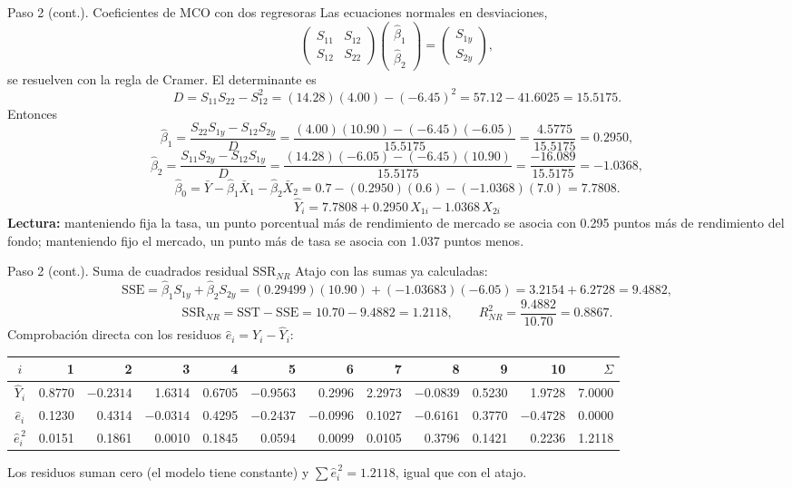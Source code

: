 \documentclass[11pt,letterpaper]{article}
\newcommand{\SSR}{\mathrm{SSR}}
\newcommand{\SSE}{\mathrm{SSE}}
\newcommand{\SST}{\mathrm{SST}}
\begin{document}
\begin{paso}{Paso 2 (cont.). Coeficientes de MCO con dos regresoras}
Las ecuaciones normales en desviaciones,
\[
\begin{pmatrix}S_{11}&S_{12}\\ S_{12}&S_{22}\end{pmatrix}
\begin{pmatrix}\hat\beta_1\\ \hat\beta_2\end{pmatrix}
=\begin{pmatrix}S_{1y}\\ S_{2y}\end{pmatrix},
\]
se resuelven con la regla de Cramer. El determinante es
\[
D=S_{11}S_{22}-S_{12}^2=(14.28)(4.00)-(-6.45)^2=57.12-41.6025=15.5175 .
\]
Entonces
\[
\hat\beta_1=\frac{S_{22}S_{1y}-S_{12}S_{2y}}{D}
=\frac{(4.00)(10.90)-(-6.45)(-6.05)}{15.5175}
=\frac{4.5775}{15.5175}=0.2950,
\]
\[
\hat\beta_2=\frac{S_{11}S_{2y}-S_{12}S_{1y}}{D}
=\frac{(14.28)(-6.05)-(-6.45)(10.90)}{15.5175}
=\frac{-16.089}{15.5175}=-1.0368,
\]
\[
\hat\beta_0=\bar Y-\hat\beta_1\bar X_1-\hat\beta_2\bar X_2
=0.7-(0.2950)(0.6)-(-1.0368)(7.0)=7.7808 .
\]
\[
\boxed{\ \hat Y_i=7.7808+0.2950\,X_{1i}-1.0368\,X_{2i}\ }
\]
\textbf{Lectura:} manteniendo fija la tasa, un punto porcentual más de rendimiento de mercado se asocia
con 0.295 puntos más de rendimiento del fondo; manteniendo fijo el mercado, un punto más de tasa se
asocia con 1.037 puntos menos.
\end{paso}

\begin{paso}{Paso 2 (cont.). Suma de cuadrados residual $\SSR_{NR}$}
Atajo con las sumas ya calculadas:
\[
\SSE=\hat\beta_1S_{1y}+\hat\beta_2S_{2y}=(0.29499)(10.90)+(-1.03683)(-6.05)=3.2154+6.2728=9.4882,
\]
\[
\SSR_{NR}=\SST-\SSE=10.70-9.4882=1.2118,\qquad R^2_{NR}=\frac{9.4882}{10.70}=0.8867 .
\]
Comprobación directa con los residuos $\hat e_i=Y_i-\hat Y_i$:
\begin{center}
\small
\footnotesize\setlength{\tabcolsep}{2.5pt}
\begin{tabular}{c*{10}{r}|r}
\toprule
$i$ & 1 & 2 & 3 & 4 & 5 & 6 & 7 & 8 & 9 & 10 & $\Sigma$\\
\midrule
$\hat Y_i$ & 0.8770 & $-0.2314$ & 1.6314 & 0.6705 & $-0.9563$ & 0.2996 & 2.2973 & $-0.0839$ & 0.5230 & 1.9728 & 7.0000\\
$\hat e_i$ & 0.1230 & 0.4314 & $-0.0314$ & 0.4295 & $-0.2437$ & $-0.0996$ & 0.1027 & $-0.6161$ & 0.3770 & $-0.4728$ & 0.0000\\
$\hat e_i^{\,2}$ & 0.0151 & 0.1861 & 0.0010 & 0.1845 & 0.0594 & 0.0099 & 0.0105 & 0.3796 & 0.1421 & 0.2236 & 1.2118\\
\bottomrule
\end{tabular}
\end{center}
Los residuos suman cero (el modelo tiene constante) y $\sum\hat e_i^{\,2}=1.2118$, igual que con el atajo.
\end{paso}
\end{document}
